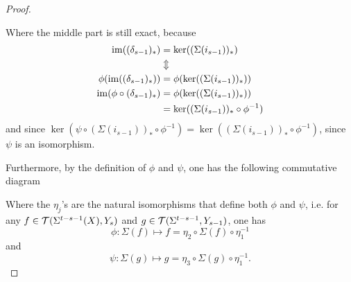 \begin{proof}
\begin{center}
    \end{center}
    Where the middle part is still exact, because
    \begin{align*}
        \operatorname{im}((\delta_{s-1})_*) &= \ker((\Sigma(i_{s-1}))_*) \\
        &\Updownarrow \\
        \phi(\operatorname{im}((\delta_{s-1})_*)) &= \phi(\ker((\Sigma(i_{s-1}))_*)) \\
        \operatorname{im}(\phi \circ (\delta_{s-1})_*) &= \phi(\ker((\Sigma(i_{s-1}))_*)) \\
        &= \ker((\Sigma(i_{s-1}))_* \circ \phi^{-1})
    \end{align*}
    and since \( \ker(\psi \circ (\Sigma(i_{s-1}))_* \circ \phi^{-1}) = \ker((\Sigma(i_{s-1}))_* \circ \phi^{-1}) \), since \( \psi \) is an isomorphism.

    Furthermore, by the definition of \( \phi \) and \( \psi \), one has the following commutative diagram
    \begin{center}
    \end{center}
    Where the \( \eta_j \)'s are the natural isomorphisms that define both \( \phi \) and \( \psi \), i.e. for any \( f \in {\mathcal{T}}(\Sigma^{t - s - 1}(X), Y_s) \) and \( g \in {\mathcal{T}}(\Sigma^{t - s - 1}, Y_{s - 1}) \), one has \sloppy
    \[
        \phi: \Sigma( f ) \mapsto f = \eta_2 \circ \Sigma( f ) \circ \eta_1^{-1}
    \]
    and
    \[
        \psi: \Sigma( g ) \mapsto g = \eta_3 \circ \Sigma( g ) \circ \eta_1^{-1}.
    \]


\end{proof}
